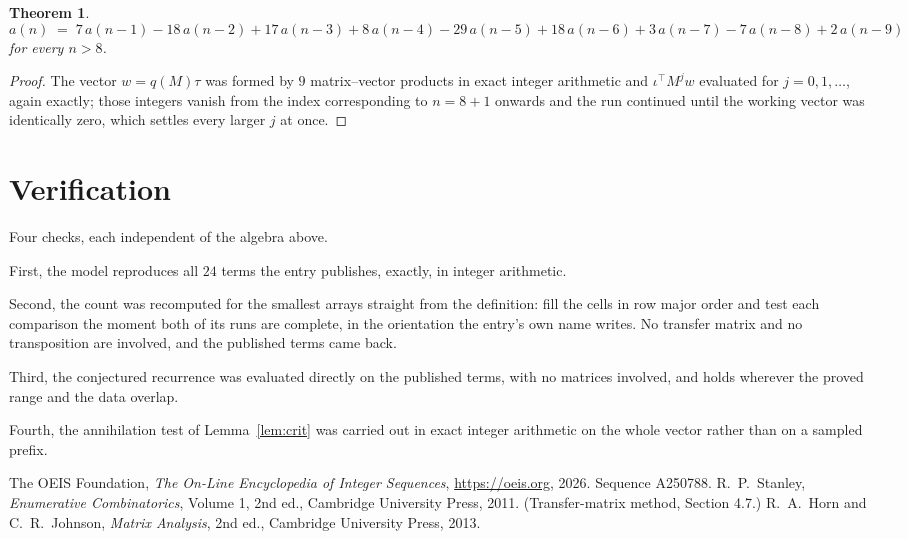 \documentclass[11pt,a4paper]{article}
\theoremstyle{plain}
\newtheorem{theorem}{Theorem}
\theoremstyle{definition}
\begin{document}
\begin{theorem}
\[
a(n)\;=\;7\,a(n-1) - 18\,a(n-2) + 17\,a(n-3) + 8\,a(n-4) - 29\,a(n-5) + 18\,a(n-6) + 3\,a(n-7) - 7\,a(n-8) + 2\,a(n-9)
\]
for every $n>8$.
\end{theorem}

\begin{proof}
The vector $w=q(M)\tau$ was formed by $9$ matrix--vector products in exact integer
arithmetic and $\iota^{\!\top}M^{j}w$ evaluated for $j=0,1,\dots$, again exactly; those
integers vanish from the index corresponding to $n=8+1$ onwards and the run continued
until the working vector was identically zero, which settles every larger $j$ at once.
\end{proof}

\section{Verification}

Four checks, each independent of the algebra above.

First, the model reproduces all $24$ terms the entry publishes, exactly, in integer
arithmetic.

Second, the count was recomputed for the smallest arrays straight from the definition: fill the
cells in row major order and test each comparison the moment both of its runs are complete,
in the orientation the entry's own name writes. No transfer matrix and no transposition are
involved, and the published terms came back.

Third, the conjectured recurrence was evaluated directly on the published terms, with no
matrices involved, and holds wherever the proved range and the data overlap.

Fourth, the annihilation test of Lemma~\ref{lem:crit} was carried out in exact integer
arithmetic on the whole vector rather than on a sampled prefix.

\begin{thebibliography}{9}
 The OEIS Foundation, \emph{The On-Line Encyclopedia of Integer
Sequences}, \url{https://oeis.org}, 2026. Sequence A250788.
 R.~P.~Stanley, \emph{Enumerative Combinatorics}, Volume 1, 2nd ed.,
Cambridge University Press, 2011. (Transfer-matrix method, Section 4.7.)
 R.~A.~Horn and C.~R.~Johnson, \emph{Matrix Analysis}, 2nd ed., Cambridge
University Press, 2013.
\end{thebibliography}
\end{document}
